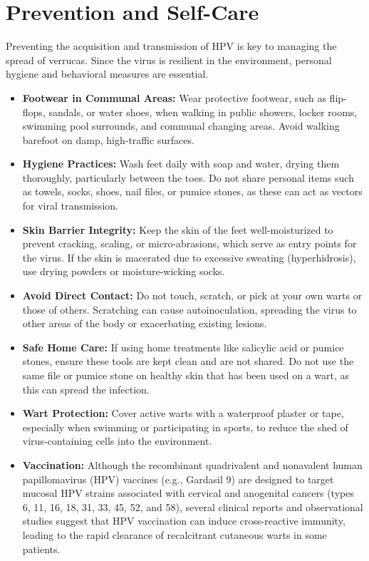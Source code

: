 \section*{Prevention and Self-Care}
Preventing the acquisition and transmission of HPV is key to managing the spread of verrucas. Since the virus is resilient in the environment, personal hygiene and behavioral measures are essential.
\begin{itemize}
    \item \textbf{Footwear in Communal Areas:} Wear protective footwear, such as flip-flops, sandals, or water shoes, when walking in public showers, locker rooms, swimming pool surrounds, and communal changing areas. Avoid walking barefoot on damp, high-traffic surfaces.
    \item \textbf{Hygiene Practices:} Wash feet daily with soap and water, drying them thoroughly, particularly between the toes. Do not share personal items such as towels, socks, shoes, nail files, or pumice stones, as these can act as vectors for viral transmission.
    \item \textbf{Skin Barrier Integrity:} Keep the skin of the feet well-moisturized to prevent cracking, scaling, or micro-abrasions, which serve as entry points for the virus. If the skin is macerated due to excessive sweating (hyperhidrosis), use drying powders or moisture-wicking socks.
    \item \textbf{Avoid Direct Contact:} Do not touch, scratch, or pick at your own warts or those of others. Scratching can cause autoinoculation, spreading the virus to other areas of the body or exacerbating existing lesions.
    \item \textbf{Safe Home Care:} If using home treatments like salicylic acid or pumice stones, ensure these tools are kept clean and are not shared. Do not use the same file or pumice stone on healthy skin that has been used on a wart, as this can spread the infection.
    \item \textbf{Wart Protection:} Cover active warts with a waterproof plaster or tape, especially when swimming or participating in sports, to reduce the shed of virus-containing cells into the environment.
    \item \textbf{Vaccination:} Although the recombinant quadrivalent and nonavalent human papillomavirus (HPV) vaccines (e.g., Gardasil 9) are designed to target mucosal HPV strains associated with cervical and anogenital cancers (types 6, 11, 16, 18, 31, 33, 45, 52, and 58), several clinical reports and observational studies suggest that HPV vaccination can induce cross-reactive immunity, leading to the rapid clearance of recalcitrant cutaneous warts in some patients.
\end{itemize}

